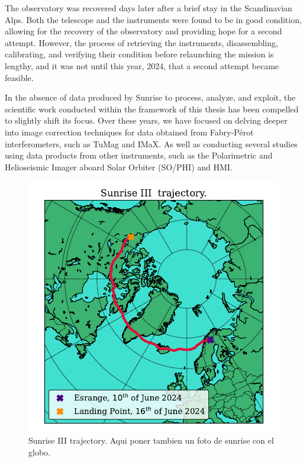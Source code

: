 The observatory was recovered days later after a brief stay in the Scandinavian Alps. Both the telescope and the instruments were found to be in good condition, allowing for the recovery of the observatory and providing hope for a second attempt. However, the process of retrieving the instruments, disassembling, calibrating, and verifying their condition before relaunching the mission is lengthy, and it was not until this year, 2024, that a second attempt became feasible.

In the absence of data produced by Sunrise to process, analyze, and exploit, the scientific work conducted within the framework of this thesis has been compelled to slightly shift its focus. Over these years, we have focused on delving deeper into image correction techniques for data obtained from Fabry-Pérot interferometers, such as TuMag and IMaX. As well as conducting several studies using data products from other instruments, such as the Polarimetric and Helioseismic Imager aboard Solar Orbiter (SO/PHI) and HMI. 

\begin{figure}
  \centering
  \includegraphics[width = \textwidth]{figures/Introduction/SunriseIII_trajectory.pdf}
  \caption{Sunrise III trajectory. Aqui poner tambien un foto de sunrise con el globo. } 
  \label{fig_intro: sunrise_trajectory}
\end{figure}

